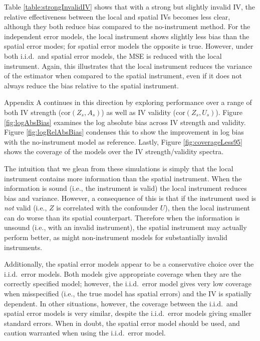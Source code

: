 \documentclass[12pt]{article}
\begin{document}
Table \ref{table:strongInvalidIV} shows that with a strong but slightly invalid IV, the relative effectiveness between the local and spatial IVs becomes less clear, although they both reduce bias compared to the no-instrument method.  For the independent error models, the local instrument shows slightly less bias than the spatial error modes; for spatial error models the opposite is true. However, under both i.i.d.~and spatial error models, the MSE is reduced with the local instrument. Again, this illustrates that the local instrument reduces the variance of the estimator when compared to the spatial instrument, even if it does not always reduce the bias relative to the spatial instrument. 

Appendix A continues in this direction by exploring performance over a range of both IV strength (cor$(Z_s,A_s)$) as well as IV validity (cor$(Z_s,U_s)$).  Figure \ref{fig:logAbsBias} examines the log absolute bias across IV strength and validity.  Figure \ref{fig:logRelAbsBias} condenses this to show the improvement in log bias with the no-instrument model as reference. Lastly, Figure \ref{fig:coverageLess95} shows the coverage of the models over the IV strength/validity spectra. 

The intuition that we glean from these simulations is simply that the local instrument contains more information than the spatial instrument. When the information is sound (i.e., the instrument is valid) the local instrument reduces bias and variance. However, a consequence of this is that if the instrument used is \emph{not} valid (i.e., $Z$ is correlated with the confounder $U$), then the local instrument can do worse than its spatial counterpart. Therefore when the information is unsound (i.e., with an invalid instrument), the spatial instrument may actually perform better, as might non-instrument models for substantially invalid instruments.  

Additionally, the spatial error models appear to be a conservative choice over the i.i.d.~error models. Both models give appropriate coverage when they are the correctly specified model; however, the i.i.d.~error model gives very low coverage when misspecified (i.e., the true model has spatial errors) and the IV is spatially dependent. In other situations, however, the coverage between the i.i.d.~and spatial error models is very similar, despite the i.i.d.~error models giving smaller standard errors. When in doubt, the spatial error model should be used, and caution warranted when using the i.i.d.~error model.
\end{document}
